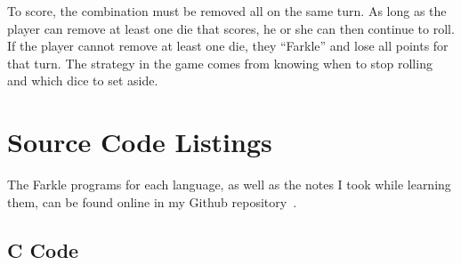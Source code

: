 \documentclass{article}
\begin{document}
To score, the combination must be removed all on the same turn.  As long as the
player can remove at least one die that scores, he or she can then continue to roll.
If the player cannot remove at least one die, they ``Farkle'' and lose all
points for that turn.  The strategy in the game comes from knowing when to stop
rolling and which dice to set aside.

\section{Source Code Listings}
The Farkle programs for each language, as well as the notes I took while learning them, can be found online in my Github repository~\cite{mygithub}.

\subsection{C Code}

\lstset{language=C,numbers=left,showspaces=false,showstringspaces=false,basicstyle=\footnotesize,numberstyle=\footnotesize}
\end{document}
